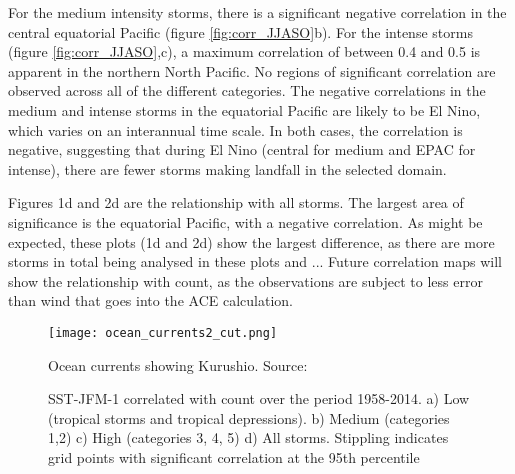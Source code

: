 For the medium intensity storms, there is a significant negative correlation in the central equatorial Pacific (figure \ref{fig:corr_JJASO}b). For the intense storms (figure \ref{fig:corr_JJASO},c), a maximum correlation of between 0.4 and 0.5 is apparent in the northern North Pacific. No regions of significant correlation are observed across all of the different categories.
The negative correlations in the medium and intense storms in the equatorial Pacific are likely to be El Nino, which varies on an interannual time scale. In both cases, the correlation is negative, suggesting that during El Nino (central for medium and EPAC for intense), there are fewer storms making landfall in the selected domain.

Figures 1d and 2d are the relationship with all storms. The largest area of significance is the equatorial Pacific, with a negative correlation. As might be expected, these plots (1d and 2d) show the largest difference, as there are more storms in total being analysed in these plots and ...
Future correlation maps will show the relationship with count, as the observations are subject to less error than wind that goes into the ACE calculation.


\begin{figure}
	\centering
	\noindent\texttt{[image: ocean\_currents2\_cut.png]}
	\caption{Ocean currents showing Kurushio. Source: \citep{kuroshio}}\label{fig:kuroshio}
\end{figure}


\begin{figure}
	\centering %
	\caption{SST-JFM-1 correlated with count over the period 1958-2014. a) Low (tropical storms and tropical depressions). b) Medium (categories 1,2) c) High (categories 3, 4, 5) d) All storms. Stippling indicates grid points with significant correlation at the 95th percentile} \label{fig:corr_prevJFM} 
\end{figure} 


